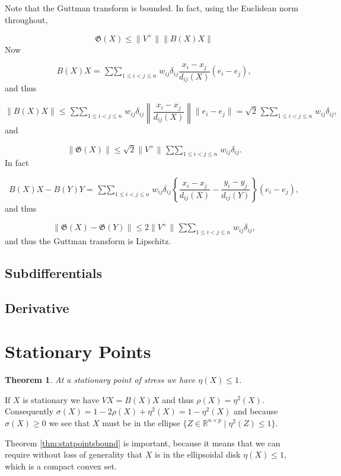 \documentclass[
  12pt,
]{book}
\newtheorem{theorem}{Theorem}[chapter]
\theoremstyle{definition}
\theoremstyle{definition}
\theoremstyle{definition}
\theoremstyle{definition}
\theoremstyle{remark}
\begin{document}
Note that the Guttman transform is bounded. In fact, using the Euclidean norm
throughout,

\[
\mathfrak{G}(X)\leq\|V^+\|\|B(X)X\|
\]
Now

\[
B(X)X=\mathop{\sum\sum}_{1\leq i<j\leq n}w_{ij}\delta_{ij}\frac{x_i-x_j}{d_{ij}(X)}(e_i-e_j),
\]
and thus

\[
\|B(X)X\|\leq\mathop{\sum\sum}_{1\leq i<j\leq n}w_{ij}\delta_{ij}\left\|\frac{x_i-x_j}{d_{ij}(X)}\right\|\|e_i-e_j\|=\sqrt{2}\mathop{\sum\sum}_{1\leq i<j\leq n}w_{ij}\delta_{ij},
\]
and

\[
\|\mathfrak{G}(X)\|\leq\sqrt{2}\|V^+\|\mathop{\sum\sum}_{1\leq i<j\leq n}w_{ij}\delta_{ij}.
\]
In fact

\[
B(X)X-B(Y)Y=\mathop{\sum\sum}_{1\leq i<j\leq n}w_{ij}\delta_{ij}\left\{\frac{x_i-x_j}{d_{ij}(X)}-\frac{y_i-y_j}{d_{ij}(Y)}\right\}(e_i-e_j),
\]
and thus

\[
\|\mathfrak{G}(X)-\mathfrak{G}(Y)\|\leq 2\|V^+\|
\mathop{\sum\sum}_{1\leq i<j\leq n}w_{ij}\delta_{ij},
\]
and thus the Guttman transform is Lipschitz.

\hypertarget{subdifferentials-1}{%
\subsection{Subdifferentials}\label{subdifferentials-1}}

\hypertarget{derivative}{%
\subsection{Derivative}\label{derivative}}

\hypertarget{propstationary}{%
\section{Stationary Points}\label{propstationary}}

\begin{theorem}
\protect\hypertarget{thm:statpointsbound}{}{\label{thm:statpointsbound} }At a stationary point of stress we have \(\eta(X)\leq 1\).
\end{theorem}

If \(X\) is stationary we have \(VX=B(X)X\) and thus \(\rho(X)=\eta^2(X)\). Consequently \(\sigma(X)=1-2\rho(X)+\eta^2(X)=1-\eta^2(X)\) and because \(\sigma(X)\geq 0\) we see that \(X\) must be in the ellipse \(\{Z\in\mathbb{R}^{n\times p}\mid\eta^2(Z)\leq 1\}\).

Theorem \ref{thm:statpointsbound} is important, because it means that we can require without loss of generality that \(X\) is in the ellipsoidal disk \(\eta(X)\leq 1\), which is a compact convex set.
\end{document}
